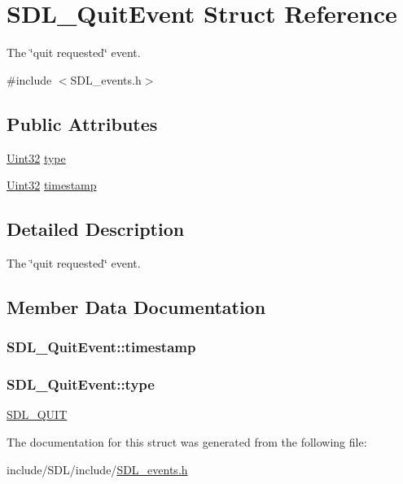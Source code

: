 \hypertarget{struct_s_d_l___quit_event}{\section{S\-D\-L\-\_\-\-Quit\-Event Struct Reference}
\label{struct_s_d_l___quit_event}
}


The \char`\"{}quit requested\char`\"{} event.  




{\ttfamily \#include $<$S\-D\-L\-\_\-events.\-h$>$}

\subsection*{Public Attributes}
\begin{DoxyCompactItemize}
\item 
\hyperlink{_s_d_l__stdinc_8h_add440eff171ea5f55cb00c4a9ab8672d}{Uint32} \hyperlink{struct_s_d_l___quit_event_a51ab0279e6de40249ba93971a8757cf0}{type}
\item 
\hyperlink{_s_d_l__stdinc_8h_add440eff171ea5f55cb00c4a9ab8672d}{Uint32} \hyperlink{struct_s_d_l___quit_event_a7acd4fa42ca96da8edac146baaa0b433}{timestamp}
\end{DoxyCompactItemize}


\subsection{Detailed Description}
The \char`\"{}quit requested\char`\"{} event. 

\subsection{Member Data Documentation}
\hypertarget{struct_s_d_l___quit_event_a7acd4fa42ca96da8edac146baaa0b433}{
\subsubsection[{timestamp}]{ S\-D\-L\-\_\-\-Quit\-Event\-::timestamp}}\label{struct_s_d_l___quit_event_a7acd4fa42ca96da8edac146baaa0b433}
\hypertarget{struct_s_d_l___quit_event_a51ab0279e6de40249ba93971a8757cf0}{
\subsubsection[{type}]{ S\-D\-L\-\_\-\-Quit\-Event\-::type}}\label{struct_s_d_l___quit_event_a51ab0279e6de40249ba93971a8757cf0}
\hyperlink{_s_d_l__events_8h_a3b589e89be6b35c02e0dd34a55f3fccaa31acc5fdafc86ebe2c1f5c3cae48d603}{S\-D\-L\-\_\-\-Q\-U\-I\-T} 

The documentation for this struct was generated from the following file\-:\begin{DoxyCompactItemize}
\item 
include/\-S\-D\-L/include/\hyperlink{_s_d_l__events_8h}{S\-D\-L\-\_\-events.\-h}\end{DoxyCompactItemize}

